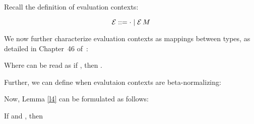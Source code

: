 \documentclass{article}
\begin{document}
Recall the definition of evaluation contexts:

\[
  \mathcal{E} ::= \cdot \mid \mathcal{E}\,M
\]

We now further characterize evaluation contexts as mappings between types, as detailed in
Chapter~46 of~\cite{Harper:16}:

Where  can be read as if , then .

Further, we can define when evalutaion contexts are beta-normalizing:


Now, Lemma \ref{l4} can be formulated as follows:

\begin{lemma}\label{l5}
If  and \bnorm{\E},
then 
\end{lemma}
\end{document}

